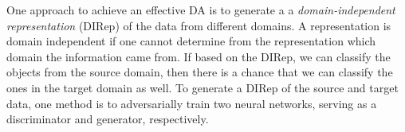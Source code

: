 \documentclass{article}
\newcommand{\remove}[1]{}
\newcommand{\elisa}[1]{\textbf{\color{red}Elisa: #1}}
\begin{document}
One approach to achieve an effective DA is to generate a a \textit{domain-independent representation} (DIRep) of the data from different domains.
A representation is domain independent if one cannot  determine from the representation which domain the information came from. If based on the DIRep,
we can classify the objects from the source domain, then there is a chance that we can classify the ones in the target domain as well. To generate a DIRep of the source and target data, one method is to adversarially train two neural networks, serving as a discriminator and generator, respectively.
\end{document}
